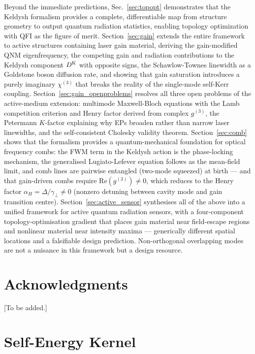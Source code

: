 \documentclass[12pt]{article}
\newcommand{\Keldysh}{{\rm K}}
\begin{document}
Beyond the immediate predictions, Sec.~\ref{sec:topopt} demonstrates
that the Keldysh formalism provides a complete, differentiable map from
structure geometry to output quantum radiation statistics, enabling
topology optimization with QFI as the figure of merit.
Section~\ref{sec:gain} extends the entire framework to active structures
containing laser gain material, deriving the gain-modified QNM
eigenfrequency, the competing gain and radiation contributions to the
Keldysh component $D^\Keldysh$ with opposite signs, the Schawlow-Townes
linewidth as a Goldstone boson diffusion rate, and showing that gain
saturation introduces a purely imaginary $\chi^{(3)}$ that breaks the
reality of the single-mode self-Kerr coupling.
Section~\ref{sec:gain_openproblems} resolves all three open problems of
the active-medium extension: multimode Maxwell-Bloch equations with the
Lamb competition criterion and Henry factor derived from complex $g^{(3)}$,
the Petermann $K$-factor explaining why EPs broaden rather than narrow laser
linewidths, and the self-consistent Cholesky validity theorem.
Section~\ref{sec:comb} shows that the formalism provides a quantum-mechanical
foundation for optical frequency combs: the FWM term in the Keldysh action is
the phase-locking mechanism, the generalised Lugiato-Lefever equation follows
as the mean-field limit, and comb lines are pairwise entangled (two-mode
squeezed) at birth --- and that gain-driven combs require $\mathrm{Re}(g^{(3)})\neq 0$,
which reduces to the Henry factor $\alpha_H = \Delta/\gamma_\perp\neq 0$
(nonzero detuning between cavity mode and gain transition centre).
Section~\ref{sec:active_sensor} synthesises all of the above into a
unified framework for active quantum radiation sensors, with a
four-component topology-optimisation gradient that places gain material near
field-escape regions and nonlinear material near intensity maxima ---
generically different spatial locations and a falsifiable design prediction.
Non-orthogonal overlapping modes are not a nuisance in this framework but a
design resource.

\section*{Acknowledgments}
[To be added.]

\appendix
\section{Self-Energy Kernel}
\label{app:self_energy}
\end{document}
